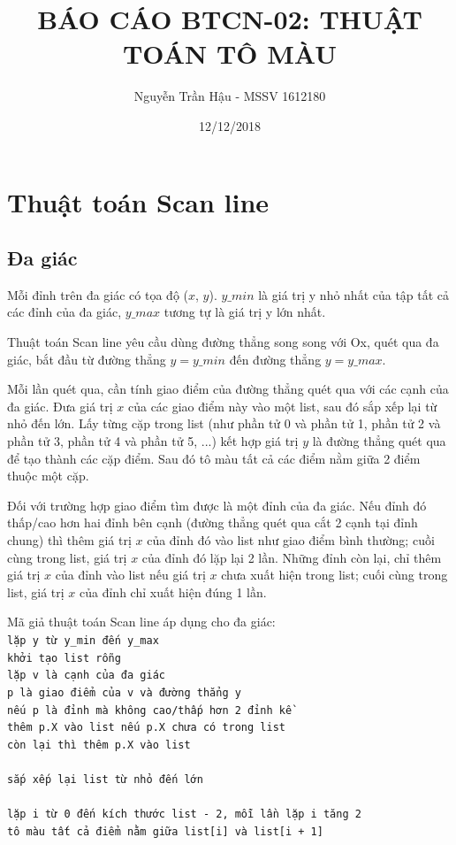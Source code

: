 \documentclass[12pt]{article}
\title{BÁO CÁO BTCN-02: THUẬT TOÁN TÔ MÀU}
\author{Nguyễn Trần Hậu - MSSV 1612180}
\date{12/12/2018}
\begin{document}
\maketitle

\section{Thuật toán Scan line}

\subsection{Đa giác}
Mỗi đỉnh trên đa giác có tọa độ ($x$, $y$).
$y\_min$ là giá trị y nhỏ nhất của tập tất cả các đỉnh của đa giác,
$y\_max$ tương tự là giá trị y lớn nhất.

Thuật toán Scan line yêu cầu dùng đường thẳng song song với Ox, quét qua đa giác,
bắt đầu từ đường thẳng $y = y\_min$ đến đường thẳng $y = y\_max$.

Mỗi lần quét qua, cần tính giao điểm của đường thẳng quét qua với các cạnh của đa giác.
Đưa giá trị $x$ của các giao điểm này vào một list, sau đó sắp xếp lại từ nhỏ đến lớn.
Lấy từng cặp trong list (như phần tử 0 và phần tử 1, phần tử 2 và phần tử 3, phần tử 4 và phần tử 5, ...)
kết hợp giá trị $y$ là đường thẳng quét qua để tạo thành các cặp điểm.
Sau đó tô màu tất cả các điểm nằm giữa 2 điểm thuộc một cặp.

Đối với trường hợp giao điểm tìm được là một đỉnh của đa giác.
Nếu đỉnh đó thấp/cao hơn hai đỉnh bên cạnh (đường thẳng quét qua cắt 2 cạnh tại đỉnh chung)
thì thêm giá trị $x$ của đỉnh đó vào list như giao điểm bình thường;
cuồi cùng trong list, giá trị $x$ của đỉnh đó lặp lại 2 lần.
Những đỉnh còn lại, chỉ thêm giá trị $x$ của đỉnh vào list nếu giá trị $x$ chưa xuất hiện trong list;
cuối cùng trong list, giá trị $x$ của đỉnh chỉ xuất hiện đúng 1 lần.

Mã giả thuật toán Scan line áp dụng cho đa giác: \\
\texttt{lặp y từ y\_min đến y\_max} \\
\texttt{\indent khởi tạo list rỗng} \\
\texttt{\indent lặp v là cạnh của đa giác} \\
\texttt{\indent\indent p là giao điểm của v và đường thẳng y} \\
\texttt{\indent\indent nếu p là đỉnh mà không cao/thấp hơn 2 đỉnh kề} \\
\texttt{\indent\indent\indent thêm p.X vào list nếu p.X chưa có trong list} \\
\texttt{\indent\indent còn lại thì thêm p.X vào list} \\ \\
\texttt{\indent sắp xếp lại list từ nhỏ đến lớn} \\ \\
\texttt{\indent lặp i từ 0 đến kích thước list - 2, mỗi lần lặp i tăng 2} \\
\texttt{\indent\indent tô màu tất cả điểm nằm giữa list[i] và list[i + 1]}
\end{document}
